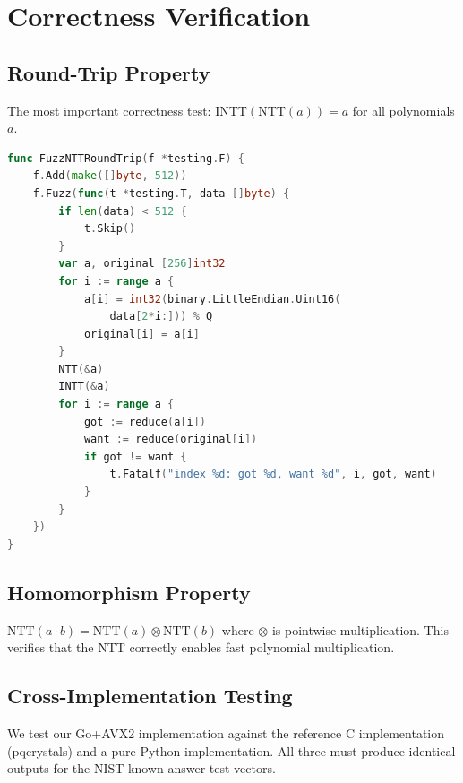 \section{Correctness Verification}


\subsection{Round-Trip Property}

The most important correctness test: $\text{INTT}(\text{NTT}(a)) = a$ for all polynomials $a$.

\begin{lstlisting}[language=Go,caption={NTT round-trip fuzz test}]
func FuzzNTTRoundTrip(f *testing.F) {
    f.Add(make([]byte, 512))
    f.Fuzz(func(t *testing.T, data []byte) {
        if len(data) < 512 {
            t.Skip()
        }
        var a, original [256]int32
        for i := range a {
            a[i] = int32(binary.LittleEndian.Uint16(
                data[2*i:])) % Q
            original[i] = a[i]
        }
        NTT(&a)
        INTT(&a)
        for i := range a {
            got := reduce(a[i])
            want := reduce(original[i])
            if got != want {
                t.Fatalf("index %d: got %d, want %d", i, got, want)
            }
        }
    })
}
\end{lstlisting}

\subsection{Homomorphism Property}

$\text{NTT}(a \cdot b) = \text{NTT}(a) \otimes \text{NTT}(b)$ where $\otimes$ is
pointwise multiplication. This verifies that the NTT correctly enables fast polynomial
multiplication.

\subsection{Cross-Implementation Testing}

We test our Go+AVX2 implementation against the reference C implementation (pqcrystals)
and a pure Python implementation. All three must produce identical outputs for the
NIST known-answer test vectors.

